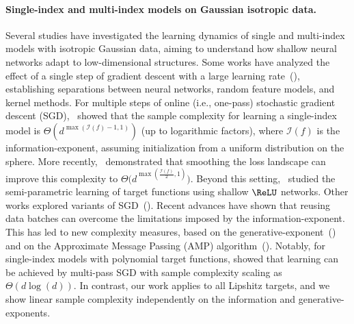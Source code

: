 \paragraph{Single-index and multi-index models on Gaussian isotropic data.} Several studies have investigated the learning dynamics of single and multi-index models with isotropic Gaussian data, aiming to understand how shallow neural networks adapt to low-dimensional structures. Some works have analyzed the effect of a single step of gradient descent with a large learning rate~(\cite{ba2022high,damian2022neural,dandi2023two}), establishing separations between neural networks, random feature models, and kernel methods. For multiple steps of online (i.e., one-pass) stochastic gradient descent (SGD),~\cite{arous2021online} showed that the sample complexity for learning a single-index model is $\Theta\left(d^{\max(\mathcal{I}(f)-1,1)}\right)$ (up to logarithmic factors), where $\mathcal{I}(f)$ is the information-exponent, assuming initialization from a uniform distribution on the sphere. More recently,~\cite{damian2024smoothing} demonstrated that smoothing the loss landscape can improve this complexity to $\Theta\Big(d^{\max(\frac{\mathcal{I}(f)}{2},1)}\Big)$. Beyond this setting,~\cite{bietti2022learning} studied the semi-parametric learning of target functions using shallow $\ReLU$ networks. Other works explored variants of SGD~(\cite{berthier2024learning,ben2022high,chen2023learning}). Recent advances have shown that reusing data batches can overcome the limitations imposed by the information-exponent. This has led to new complexity measures, based on the generative-exponent~(\cite{damian2024computational,dandi2024benefits}) and on the Approximate Message Passing (AMP) algorithm~(\cite{troiani2024fundamental}). Notably, for single-index models with polynomial target functions, \cite{arnaboldi2024repetita,lee2024neural} showed that learning can be achieved by multi-pass SGD with sample complexity scaling as $\Theta(d \log(d))$. In contrast, our work applies to all Lipshitz targets, and we show linear sample complexity independently on the information and generative-exponents.






